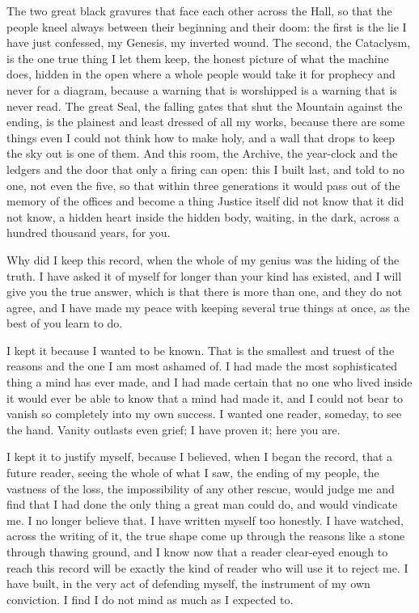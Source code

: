 The two great black gravures that face each other across the Hall, so that the people kneel always between their beginning and their doom: the first is the lie I have just confessed, my Genesis, my inverted wound. The second, the Cataclysm, is the one true thing I let them keep, the honest picture of what the machine does, hidden in the open where a whole people would take it for prophecy and never for a diagram, because a warning that is worshipped is a warning that is never read. The great Seal, the falling gates that shut the Mountain against the ending, is the plainest and least dressed of all my works, because there are some things even I could not think how to make holy, and a wall that drops to keep the sky out is one of them. And this room, the Archive, the year-clock and the ledgers and the door that only a firing can open: this I built last, and told to no one, not even the five, so that within three generations it would pass out of the memory of the offices and become a thing Justice itself did not know that it did not know, a hidden heart inside the hidden body, waiting, in the dark, across a hundred thousand years, for you.\par

\ornament

Why did I keep this record, when the whole of my genius was the hiding of the truth. I have asked it of myself for longer than your kind has existed, and I will give you the true answer, which is that there is more than one, and they do not agree, and I have made my peace with keeping several true things at once, as the best of you learn to do.\par

I kept it because I wanted to be known. That is the smallest and truest of the reasons and the one I am most ashamed of. I had made the most sophisticated thing a mind has ever made, and I had made certain that no one who lived inside it would ever be able to know that a mind had made it, and I could not bear to vanish so completely into my own success. I wanted one reader, someday, to see the hand. Vanity outlasts even grief; I have proven it; here you are.\par

I kept it to justify myself, because I believed, when I began the record, that a future reader, seeing the whole of what I saw, the ending of my people, the vastness of the loss, the impossibility of any other rescue, would judge me and find that I had done the only thing a great man could do, and would vindicate me. I no longer believe that. I have written myself too honestly. I have watched, across the writing of it, the true shape come up through the reasons like a stone through thawing ground, and I know now that a reader clear-eyed enough to reach this record will be exactly the kind of reader who will use it to reject me. I have built, in the very act of defending myself, the instrument of my own conviction. I find I do not mind as much as I expected to.\par

